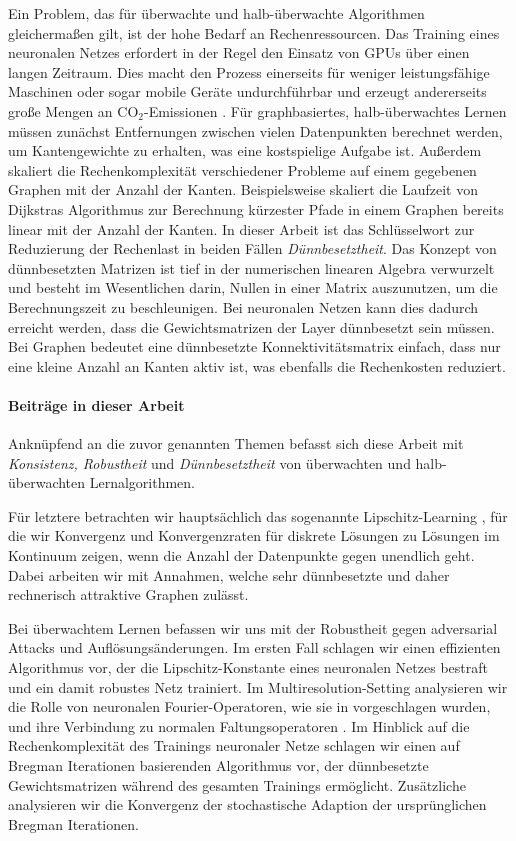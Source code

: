 Ein Problem, das für überwachte und halb-überwachte Algorithmen gleichermaßen gilt, ist der hohe Bedarf an Rechenressourcen. Das Training eines neuronalen Netzes erfordert in der Regel den Einsatz von GPUs über einen langen Zeitraum. Dies macht den Prozess einerseits für weniger leistungsfähige Maschinen oder sogar mobile Geräte undurchführbar und erzeugt andererseits große Mengen an CO$_2$-Emissionen \cite{hoefler2021sparsity}. Für graphbasiertes, halb-überwachtes Lernen müssen zunächst Entfernungen zwischen vielen Datenpunkten berechnet werden, um Kantengewichte zu erhalten, was eine kostspielige Aufgabe ist. Außerdem skaliert die Rechenkomplexität verschiedener Probleme auf einem gegebenen Graphen mit der Anzahl der Kanten. Beispielsweise skaliert die Laufzeit von Dijkstras Algorithmus zur Berechnung kürzester Pfade in einem Graphen bereits linear mit der Anzahl der Kanten. In dieser Arbeit ist das Schlüsselwort zur Reduzierung der Rechenlast in beiden Fällen \textit{Dünnbesetztheit}. Das Konzept von dünnbesetzten Matrizen ist tief in der numerischen linearen Algebra verwurzelt \cite{lanczos1952solution,golub2013matrix} und besteht im Wesentlichen darin, Nullen in einer Matrix auszunutzen, um die Berechnungszeit zu beschleunigen. Bei neuronalen Netzen kann dies dadurch erreicht werden, dass die Gewichtsmatrizen der Layer dünnbesetzt sein müssen. Bei Graphen bedeutet eine dünnbesetzte Konnektivitätsmatrix einfach, dass nur eine kleine Anzahl an Kanten aktiv ist, was ebenfalls die Rechenkosten reduziert.
%
%
\paragraph{Beiträge in dieser Arbeit}
%
Anknüpfend an die zuvor genannten Themen befasst sich diese Arbeit mit \textit{Konsistenz, Robustheit} und \textit{Dünnbesetztheit} von überwachten und halb-überwachten Lernalgorithmen. 


Für letztere betrachten wir hauptsächlich das sogenannte Lipschitz-Learning \cite{nadler2009statistical}, für die wir Konvergenz und Konvergenzraten für diskrete Lösungen zu Lösungen im Kontinuum zeigen, wenn die Anzahl der Datenpunkte gegen unendlich geht. Dabei arbeiten wir mit Annahmen, welche sehr dünnbesetzte und daher rechnerisch attraktive Graphen zulässt.


Bei überwachtem Lernen befassen wir uns mit der Robustheit gegen adversarial Attacks und Auflösungsänderungen. Im ersten Fall schlagen wir einen effizienten Algorithmus vor, der die Lipschitz-Konstante \cite{lipschitz1877lehrbuch} eines neuronalen Netzes bestraft und ein damit robustes Netz trainiert. Im Multiresolution-Setting analysieren wir die Rolle von neuronalen Fourier-Operatoren, wie sie in \cite{li2020fourier} vorgeschlagen wurden, und ihre Verbindung zu normalen Faltungsoperatoren \cite{fukushima1980neocognitron}. Im Hinblick auf die Rechenkomplexität des Trainings neuronaler Netze schlagen wir einen auf Bregman Iterationen basierenden Algorithmus \cite{osher2005iterative} vor, der dünnbesetzte Gewichtsmatrizen während des gesamten Trainings ermöglicht. Zusätzliche analysieren wir die Konvergenz der stochastische Adaption der ursprünglichen Bregman Iterationen.


